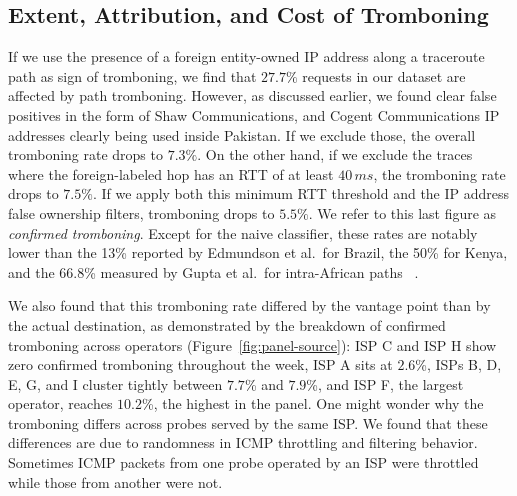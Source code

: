 \documentclass[sigconf,anonymous,10pt]{acmart}
\begin{document}

\subsection{Extent, Attribution, and Cost of Tromboning}
\label{sec:rq3}
If we use the presence of a foreign entity-owned IP address along a traceroute path as sign of tromboning, we find that $27.7\%$ requests in our dataset are affected by path tromboning. However, as discussed earlier, we found clear false positives in the form of Shaw Communications, and Cogent Communications IP addresses clearly being used inside Pakistan. If we exclude those, the overall tromboning rate drops to $7.3\%$. On the other hand, if we exclude the traces where the foreign-labeled hop has an RTT of at least $40\,ms$, the tromboning rate drops to $7.5\%$. If we apply both this minimum RTT threshold and the IP address false ownership filters, tromboning drops to $5.5\%$. We refer to this last figure as \textit{confirmed tromboning}. %
Except for the naive classifier, these rates are notably lower than the 13\% reported by Edmundson et al.\ for Brazil, the 50\% for Kenya, and the 66.8\% measured by Gupta et al.\ for intra-African paths ~\cite{edmundson2016characterizing, gupta2014}. 

We also found that this tromboning rate differed by the vantage point than by the actual destination, as demonstrated by the breakdown of confirmed tromboning across operators (Figure~\ref{fig:panel-source}): ISP C and ISP H show zero confirmed tromboning throughout the week, ISP A sits at $2.6$\%, ISPs B, D, E, G, and I cluster tightly between $7.7$\% and $7.9$\%, and ISP F, the largest operator, reaches $10.2$\%, the highest in the panel. One might wonder why the tromboning differs across probes served by the same ISP. We found that these differences are due to randomness in ICMP throttling and filtering behavior. Sometimes ICMP packets from one probe operated by an ISP were throttled while those from another were not.   
\end{document}
